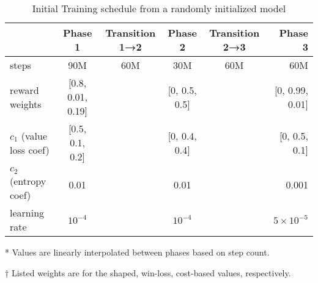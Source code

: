 \documentclass{article}
\begin{document}
\begin{table}[H]
\end{table}

\begin{table}[H]
    \centering
    \begin{threeparttable}
    \caption{Initial Training schedule from a randomly initialized model}
    \label{tab:initial-training-schedule}
    \begin{tabular}{lccccr}
    \toprule
     & Phase 1 & Transition 1→2\tnote{*} & Phase 2 & Transition 2→3\tnote{*} & Phase 3 \\
    \midrule
    steps & 90M & 60M & 30M & 60M & 60M \\
    reward weights\tnote{†} & [0.8, 0.01, 0.19] &  & [0, 0.5, 0.5] &  & [0, 0.99, 0.01] \\
    $c_1$ (value loss coef)\tnote{†} & [0.5, 0.1, 0.2] &  & [0, 0.4, 0.4] &  & [0, 0.5, 0.1]\\
    $c_2$ (entropy coef)& 0.01 & & 0.01 & & 0.001 \\
    learning rate & $10^{-4}$ & & $10^{-4}$ & & $5 \times 10^{-5}$\\
    \bottomrule
    \end{tabular}
    \begin{tablenotes}
       \item[*] Values are linearly interpolated between phases based on step count.
       \item[†] Listed weights are for the shaped, win-loss, cost-based values, respectively.
    \end{tablenotes}
    \end{threeparttable}
\end{table}
\end{document}
